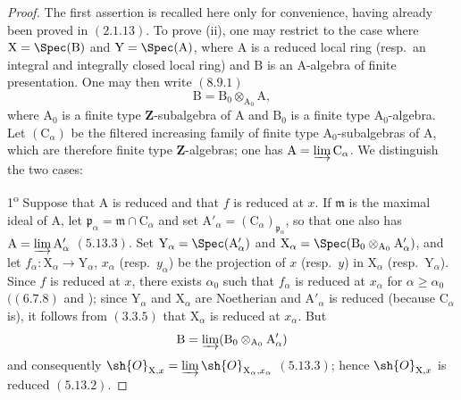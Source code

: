 \begin{proof}
The first assertion is recalled here only for convenience, having already been proved in $(2.1.13)$. To prove (ii), one may restrict to the case where $\mathrm{X}=\Spec(\mathrm{B})$ and $\mathrm{Y}=\Spec(\mathrm{A})$, where $\mathrm{A}$ is a reduced local ring (resp.\ an integral and integrally closed local ring) and $\mathrm{B}$ is an $\mathrm{A}$-algebra of finite presentation. One may then write $(8.9.1)$
\[
  \mathrm{B}=\mathrm{B}_0\otimes_{\mathrm{A}_0}\mathrm{A},
\]
where $\mathrm{A}_0$ is a finite type $\mathbf{Z}$-subalgebra of $\mathrm{A}$ and $\mathrm{B}_0$ is a finite type $\mathrm{A}_0$-algebra. Let $(\mathrm{C}_\alpha)$ be the filtered increasing family of finite type $\mathrm{A}_0$-subalgebras of $\mathrm{A}$, which are therefore finite type $\mathbf{Z}$-algebras; one has $\mathrm{A}=\varinjlim\mathrm{C}_\alpha$. We distinguish the two cases:

1\textsuperscript{o} Suppose that $\mathrm{A}$ is reduced and that $f$ is reduced at $x$. If $\mathfrak{m}$ is the maximal ideal of $\mathrm{A}$, let $\mathfrak{p}_\alpha=\mathfrak{m}\cap\mathrm{C}_\alpha$ and set $\mathrm{A}'_\alpha=(\mathrm{C}_\alpha)_{\mathfrak{p}_\alpha}$, so that one also has $\mathrm{A}=\varinjlim\mathrm{A}'_\alpha$ $(5.13.3)$. Set $\mathrm{Y}_\alpha=\Spec(\mathrm{A}'_\alpha)$ and $\mathrm{X}_\alpha=\Spec(\mathrm{B}_0\otimes_{\mathrm{A}_0}\mathrm{A}'_\alpha)$, and let $f_\alpha:\mathrm{X}_\alpha\to\mathrm{Y}_\alpha$, $x_\alpha$ (resp.\ $y_\alpha$) be the projection of $x$ (resp.\ $y$) in $\mathrm{X}_\alpha$ (resp.\ $\mathrm{Y}_\alpha$). Since $f$ is reduced at $x$, there exists $\alpha_0$ such that $f_\alpha$ is reduced at $x_\alpha$ for $\alpha\geqslant\alpha_0$ $((6.7.8)$ and ); since $\mathrm{Y}_\alpha$ and $\mathrm{X}_\alpha$ are Noetherian and $\mathrm{A}'_\alpha$ is reduced (because $\mathrm{C}_\alpha$ is), it follows from $(3.3.5)$ that $\mathrm{X}_\alpha$ is reduced at $x_\alpha$. But
\[
  \mathrm{B}=\varinjlim(\mathrm{B}_0\otimes_{\mathrm{A}_0}\mathrm{A}'_\alpha)
\]
and consequently $\sh{O}_{\mathrm{X},x}=\varinjlim\sh{O}_{\mathrm{X}_\alpha,x_\alpha}$ $(5.13.3)$; hence $\sh{O}_{\mathrm{X},x}$ is reduced $(5.13.2)$.


\end{proof}
